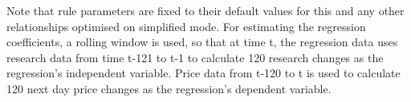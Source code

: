 \documentclass{article}%
\begin{document}
\vspace{1mm}
\justify Note that rule parameters are fixed to their default values for this and any other relationships optimised on simplified mode. For estimating the regression coefficients, a rolling window is used, so that at time t, the regression data uses research data from time t-121 to t-1 to calculate 120 research changes as the regression's independent variable. Price data from t-120 to t is used to calculate 120 next day price changes as the regression's dependent variable. %
\assumptions%
\keyterms%
\furtherlinks%
\appendixinfertrade{
\vspace{1mm}
\regressionanderrorpartone}
\end{document}
